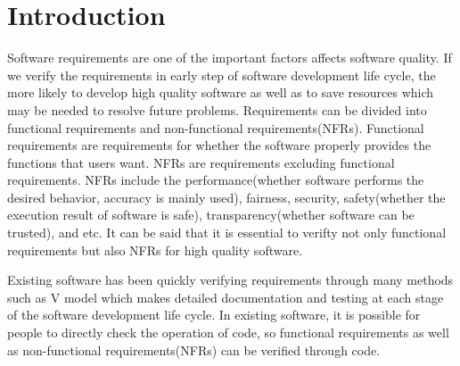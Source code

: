 \documentclass[journal,article,submit,moreauthors,pdftex]{Definitions/mdpi}
\begin{document}
\section{Introduction}

Software requirements are one of the important factors affects software quality.
If we verify the requirements in early step of software development life cycle, the more likely to develop high quality software as well as to save resources which may be needed to resolve future problems.
Requirements can be divided into functional requirements and non-functional requirements(NFRs).
Functional requirements are requirements for whether the software properly provides the functions that users want.
NFRs are requirements excluding functional requirements. NFRs include the performance(whether software performs the desired behavior, accuracy is mainly used), fairness\cite{fairness-microsoft, fairness-dwork, fairness-feldman, fairness-tramer, fairness-zhang, fairness-zemel}, security\cite{security-mei, security-mei2, security-barreno}, safety(whether the execution result of software is safe)\cite{safety-amodei,safety-juric,safety-leike}, transparency(whether software can be trusted)\cite{transparency-yosinski,xai-transparency-ribeiro,xai-transparency-murdoch}, and etc. %
It can be said that it is essential to verifty not only functional requirements but also NFRs for high quality software.

Existing software has been quickly verifying requirements through many methods such as V model which makes detailed documentation and testing at each stage of the software development life cycle.
In existing software, it is possible for people to directly check the operation of code, so functional requirements as well as non-functional requirements(NFRs) can be verified through code.
\end{document}
